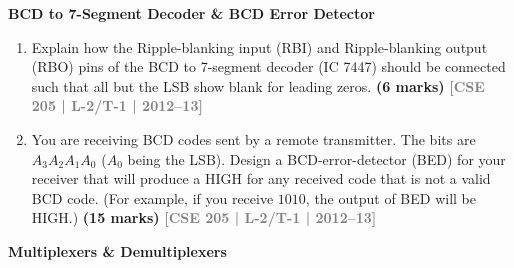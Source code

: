 \documentclass[12pt,a4paper]{article}
\newcommand{\yr}[1]{\hfill\textcolor{gray}{\small\textbf{[#1]}}}
\newcommand{\mk}[1]{\textcolor{orange!70!black}{\small\textbf{(#1 marks)}}}
\newcommand{\subtopic}[2]{%
  \vspace{10pt}
  \noindent\begin{tcolorbox}[colback=#1!8,colframe=#1,boxrule=0.6pt,arc=4pt,
    left=6pt,right=6pt,top=4pt,bottom=4pt]
    \small\bfseries\textcolor{#1}{#2}
  \end{tcolorbox}
  \vspace{2pt}
}
\begin{document}
\subtopic{cD}{BCD to 7-Segment Decoder \& BCD Error Detector}
\label{sub:s4-bcd}

\begin{enumerate}

\item Explain how the Ripple-blanking input (RBI) and Ripple-blanking output (RBO) pins of the BCD to 7-segment decoder (IC 7447) should be connected such that all but the LSB show blank for leading zeros.
\mk{6} \yr{CSE 205 | L-2/T-1 | 2012--13}

\item You are receiving BCD codes sent by a remote transmitter. The bits are $A_3A_2A_1A_0$ ($A_0$ being the LSB). Design a BCD-error-detector (BED) for your receiver that will produce a HIGH for any received code that is not a valid BCD code. (For example, if you receive $1010$, the output of BED will be HIGH.)
\mk{15} \yr{CSE 205 | L-2/T-1 | 2012--13}

\end{enumerate}

\subtopic{cD}{Multiplexers \& Demultiplexers}
\label{sub:s4-mux}
\end{document}
